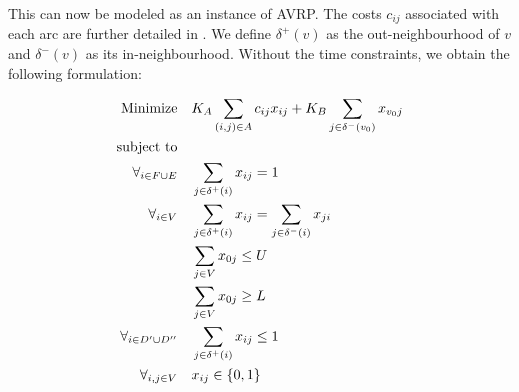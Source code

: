 This can now be modeled as an instance of AVRP. The costs $c_{ij}$ associated
with each arc are further detailed in \citet{Aringhieri04}.  We define
$\delta^+(v)$ as the out-neighbourhood of $v$ and $\delta^-(v)$ as its
in-neighbourhood. Without the time constraints, we obtain the following
formulation:

\begin{align}
	\mbox{Minimize} & \quad K_A \sum_{(i, j) \in A} c_{ij} x_{ij} +
				K_B \sum_{j \in \delta^-(v_0)} x_{v_0j}
	\\
	\mbox{subject to} & \notag{}
	\\
	\forall_{i \in F \cup E} & \quad \sum_{j \in \delta^+(i)} x_{ij} = 1
	\label{avrp-rr:indegree}
	\\
	\forall_{i \in V} & \quad \sum_{j \in \delta^+(i)} x_{ij} = \sum_{j \in \delta^-(i)} x_{ji}
	\label{avrp-rr:in-out}
	\\
	& \quad \sum_{j \in V} x_{0j} \leq U \label{avrp-rr:upper-k} \\
	& \quad \sum_{j \in V} x_{0j} \geq L \label{avrp-rr:lower-k} \\
	\forall_{i \in D^\prime \cup D^{\prime\prime}} & \quad \sum_{j \in \delta^+(i)} x_{ij} \leq 1 \\
	\forall_{i, j \in V} & \quad x_{ij} \in \{0, 1\}
\end{align}


